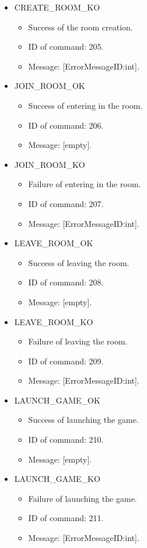 \documentclass[a4 paper, 12pt]{report}
\begin{document}
\begin{itemize}
\item CREATE\_ROOM\_KO
  \begin{itemize}
  \item Success of the room creation.
  \item ID of command: 205.
  \item Message: [ErrorMessageID:int].
  \end{itemize}

\newpage

\item JOIN\_ROOM\_OK
  \begin{itemize}
  \item Success of entering in the room.
  \item ID of command: 206.
  \item Message: [empty].
  \end{itemize}

\item JOIN\_ROOM\_KO
  \begin{itemize}
  \item Failure of entering in the room.
  \item ID of command: 207.
  \item Message: [ErrorMessageID:int].
  \end{itemize}

\item LEAVE\_ROOM\_OK
  \begin{itemize}
  \item Success of leaving the room.
  \item ID of command: 208.
  \item Message: [empty].
  \end{itemize}

\item LEAVE\_ROOM\_KO
  \begin{itemize}
  \item Failure of leaving the room.
  \item ID of command: 209.
  \item Message: [ErrorMessageID:int].
  \end{itemize}

\item LAUNCH\_GAME\_OK
  \begin{itemize}
  \item Success of launching the game.
  \item ID of command: 210.
  \item Message: [empty].
  \end{itemize}

\item LAUNCH\_GAME\_KO
  \begin{itemize}
  \item Failure of launching the game.
  \item ID of command: 211.
  \item Message: [ErrorMessageID:int].
  \end{itemize}
\end{itemize}
\end{document}
